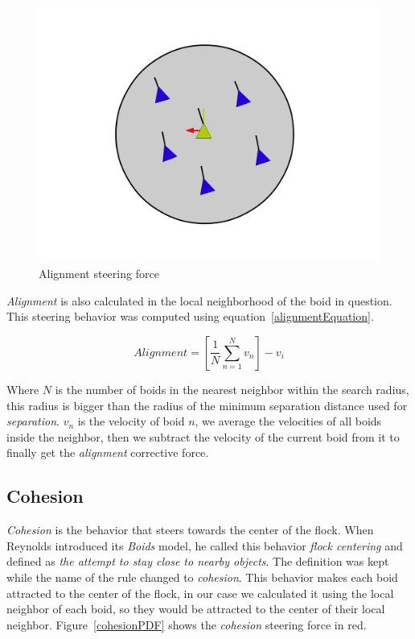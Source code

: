 \begin{figure}[htbp]
\begin{center}
\includegraphics[scale=0.3]{figures/alignment.pdf}
\caption{Alignment steering force}
\label{alignmentPDF}
\end{center}
\end{figure}

\textit{Alignment} is also calculated in the local neighborhood of the boid in question. This steering behavior was computed using equation~\ref{alignmentEquation}.

\begin{equation}
\label{alignmentEquation}
Alignment = \left[  \frac{1}{N} \sum_{n=1}^{N} v_n \right ] - v_i
\end{equation}

Where $N$ is the number of boids in the nearest neighbor within the search radius, this radius is bigger than the radius of the minimum separation distance used for \textit{separation}. $v_n$ is the velocity of boid $n$, we average the velocities of all boids inside the neighbor, then we subtract the velocity of the current boid from it to finally get the \textit{alignment} corrective force.

\subsection{Cohesion}
\textit{Cohesion} is the behavior that steers towards the center of the flock. When Reynolds introduced its \textit{Boids} model, he called this behavior \textit{flock centering} and defined as \textit{the attempt to stay close to nearby objects}. The definition was kept while the name of the rule changed to \textit{cohesion}. This behavior makes each boid attracted to the center of the flock, in our case we calculated it using the local neighbor of each boid, so they would be attracted to the center of their local neighbor.  Figure~\ref{cohesionPDF} shows the \textit{cohesion} steering force in red.

